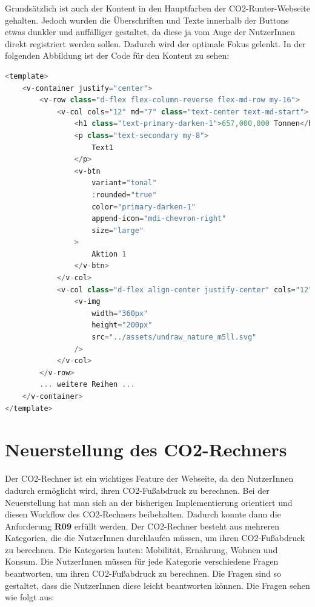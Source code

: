 Grundsätzlich ist auch der Kontent in den Hauptfarben der CO2-Runter-Webseite gehalten. Jedoch wurden die Überschriften und Texte innerhalb der Buttons etwas dunkler und auffälliger gestaltet, da diese ja vom Auge der NutzerInnen direkt registriert werden sollen. Dadurch wird der optimale Fokus gelenkt. In der folgenden Abbildung ist der Code für den Kontent zu sehen:

\begin{lstlisting}[language={JavaScript}, caption={Home Page Kontent}]
<template>
    <v-container justify="center">
        <v-row class="d-flex flex-column-reverse flex-md-row my-16">
            <v-col cols="12" md="7" class="text-center text-md-start">
                <h1 class="text-primary-darken-1">657,000,000 Tonnen</h1>
                <p class="text-secondary my-8">
                    Text1
                </p>
                <v-btn
                    variant="tonal"
                    :rounded="true"
                    color="primary-darken-1"
                    append-icon="mdi-chevron-right"
                    size="large"
                >
                    Aktion 1
                </v-btn>
            </v-col>
            <v-col class="d-flex align-center justify-center" cols="12" md="5">
                <v-img
                    width="360px"
                    height="200px"
                    src="../assets/undraw_nature_m5ll.svg"
                />
            </v-col>
        </v-row>
        ... weitere Reihen ...
    </v-container>
</template>
\end{lstlisting}

\section{Neuerstellung des CO2-Rechners}
\label{chapter:neuerstellung_co2rechner}

Der CO2-Rechner ist ein wichtiges Feature der Webseite, da den NutzerInnen dadurch ermöglicht wird, ihren CO2-Fußabdruck zu berechnen. Bei der Neuerstellung hat man sich an der bisherigen Implementierung orientiert und diesen Workflow des CO2-Rechners beibehalten. Dadurch konnte dann die Anforderung \textbf{R09} erfüllt werden. Der CO2-Rechner besteht aus mehreren Kategorien, die die NutzerInnen durchlaufen müssen, um ihren CO2-Fußabdruck zu berechnen. Die Kategorien lauten: Mobilität, Ernährung, Wohnen und Konsum. Die NutzerInnen müssen für jede Kategorie verschiedene Fragen beantworten, um ihren CO2-Fußabdruck zu berechnen. Die Fragen sind so gestaltet, dass die NutzerInnen diese leicht beantworten können. Die Fragen sehen wie folgt aus:


